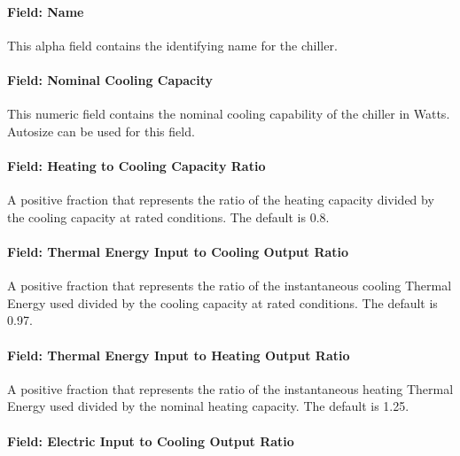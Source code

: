 \paragraph{Field: Name}\label{field-name-8-014}

This alpha field contains the identifying name for the chiller.

\paragraph{Field: Nominal Cooling Capacity}\label{field-nominal-cooling-capacity-1}

This numeric field contains the nominal cooling capability of the chiller in Watts. Autosize can be used for this field.

\paragraph{Field: Heating to Cooling Capacity Ratio}\label{field-heating-to-cooling-capacity-ratio-1}

A positive fraction that represents the ratio of the heating capacity divided by the cooling capacity at rated conditions. The default is 0.8.

\paragraph{Field: Thermal Energy Input to Cooling Output Ratio}\label{field-thermal-energy-input-to-cooling-output-ratio}

A positive fraction that represents the ratio of the instantaneous cooling Thermal Energy used divided by the cooling capacity at rated conditions. The default is 0.97.

\paragraph{Field: Thermal Energy Input to Heating Output Ratio}\label{field-thermal-energy-input-to-heating-output-ratio}

A positive fraction that represents the ratio of the instantaneous heating Thermal Energy used divided by the nominal heating capacity. The default is 1.25.

\paragraph{Field: Electric Input to Cooling Output Ratio}\label{field-electric-input-to-cooling-output-ratio-1}

